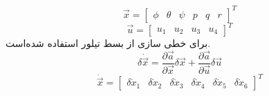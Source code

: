 \begin{equation}
	\vec{x} = \begin{bmatrix}
		\phi& \theta & \psi & p& q& r
	\end{bmatrix}^T
\end{equation}
\begin{equation}
	\vec{u} = \begin{bmatrix}
		u_1&u_2&u_3&u_4
	\end{bmatrix}^T
\end{equation}
برای خطی سازی از بسط تیلور استفاده شده‌است.
\begin{equation}
	\delta \dot{\vec{x}} = \dfrac{\partial \vec a}{\partial \vec x}\delta \vec x + \dfrac{\partial \vec a}{\partial \vec u}\delta \vec u 
\end{equation}
\begin{equation}
	\dot{\vec{x}} =
	\begin{bmatrix}
		\delta \dot x_1&
		\delta \dot x_2&
		\delta \dot x_3&
		\delta \dot x_4&
		\delta \dot x_5&
		\delta \dot x_6
	\end{bmatrix}^T
\end{equation}

